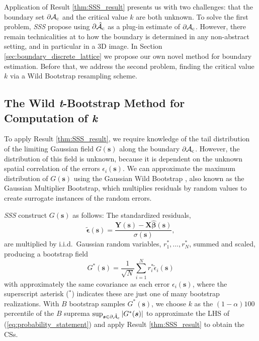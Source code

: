 Application of Result \ref{thm:SSS_result} presents us with two challenges: that the boundary set $\operatorname{\partial\mathcal{A}_{c}}$ and the critical value $k$ are both unknown.  To solve the first problem, \textit{SSS} propose using $\operatorname{\partial\hat{\mathcal{A}}_{c}}$ as a plug-in estimate of $\operatorname{\partial\mathcal{A}_{c}}$. However, there remain technicalities at to how the boundary is determined in any non-abstract setting, and in particular in a 3D image. In Section \ref{sec:boundary_discrete_lattice} we propose our own novel method for boundary estimation. Before that, we address the second problem, finding the critical value $k$ via a Wild Bootstrap resampling scheme. 

\subsection{The Wild \textit{t}-Bootstrap Method for Computation of \textit{k}}
\label{sec:wild_bootstrap}
To apply Result \ref{thm:SSS_result}, we require knowledge of the tail distribution of the limiting Gaussian field $G(\bm{s})$ along the boundary $\operatorname{\partial\mathcal{A}_{c}}$. However, the distribution of this field is unknown, because it is dependent on the unknown spatial correlation of the errors $\epsilon_i(\bm{s})$. We can approximate the maximum distribution of $G(\bm{s})$ using the Gaussian Wild Bootstrap \citep{Chernozhukov2013-wz}, also known as the Gaussian Multiplier Bootstrap, which multiplies residuals by random values to create surrogate instances of the random errors.

\textit{SSS} construct $G(\bm{s})$ as follows: The standardized residuals,
\begin{equation}
\label{eq:SSS_standardized_residuals}
\tilde{\bm{\epsilon}}(\bm{s}) = \frac{ \bm{Y}(\bm{s}) - \bm{X}\hat{\bm{\beta}}(\bm{s})}{\sigma(\bm{s})},
\end{equation}
%
are  multiplied by i.i.d.~Gaussian random variables, $r^*_1,...,r^*_N$,  summed and scaled, producing a bootstrap field
\begin{equation}
\label{eq:SSS_residual_field}
G^*(\bm{s}) = \frac{1}{\sqrt{N}}\sum_{i=1}^{N} r^*_i\tilde{\epsilon}_{i}(\bm{s})
\end{equation}
with approximately the same covariance as each error $\epsilon_i(\bm{s})$, where the superscript asterisk ($^{*}$) indicates these are just one of many bootstrap realizations. With $B$ bootstrap samples $G^*(\bm{s})$, we choose $k$ as the $(1 - \alpha)100$ percentile of the $B$ suprema $\sup_{\bm{s}\in\operatorname{\partial\hat{\mathcal{A}}_{c}}}|G^*(\bm{s})|$ to approximate the LHS of (\ref{eq:probability_statement}) and apply Result \ref{thm:SSS_result} to obtain the CSs. 

